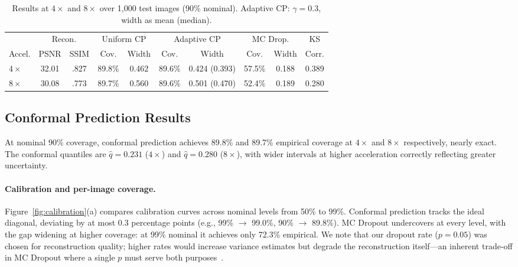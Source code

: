 \documentclass[runningheads]{llncs}
\begin{document}
\begin{table}[t]
    \centering
    \caption{Results at $4{\times}$ and $8{\times}$ over 1{,}000 test images (90\% nominal). Adaptive CP: $\gamma{=}0.3$, width as mean (median).}
    \label{tab:results}
    \begin{tabular}{lccccccccc}
        \toprule
                  & \multicolumn{2}{c}{Recon.} & \multicolumn{2}{c}{Uniform CP} & \multicolumn{2}{c}{Adaptive CP} & \multicolumn{2}{c}{MC Drop.} & KS                                              \\
        \cmidrule(lr){2-3} \cmidrule(lr){4-5} \cmidrule(lr){6-7} \cmidrule(lr){8-9} \cmidrule(lr){10-10}
        Accel.    & PSNR                       & SSIM                           & Cov.                            & Width                        & Cov.   & Width         & Cov.   & Width & Corr. \\
        \midrule
        $4\times$ & 32.01                      & .827                           & 89.8\%                          & 0.462                        & 89.6\% & 0.424 (0.393) & 57.5\% & 0.188 & 0.389 \\
        $8\times$ & 30.08                      & .773                           & 89.7\%                          & 0.560                        & 89.6\% & 0.501 (0.470) & 52.4\% & 0.189 & 0.280 \\
        \bottomrule
    \end{tabular}
\end{table}

\subsection{Conformal Prediction Results}

At nominal 90\% coverage, conformal prediction achieves 89.8\% and 89.7\% empirical coverage at $4{\times}$ and $8{\times}$ respectively, nearly exact. The conformal quantiles are $\hat{q}{=}0.231$ ($4{\times}$) and $\hat{q}{=}0.280$ ($8{\times}$), with wider intervals at higher acceleration correctly reflecting greater uncertainty.

\paragraph{Calibration and per-image coverage.} Figure~\ref{fig:calibration}(a) compares calibration curves across nominal levels from 50\% to 99\%. Conformal prediction tracks the ideal diagonal, deviating by at most 0.3 percentage points (e.g., 99\% $\to$ 99.0\%, 90\% $\to$ 89.8\%). MC Dropout undercovers at every level, with the gap widening at higher coverage: at 99\% nominal it achieves only 72.3\% empirical. We note that our dropout rate ($p{=}0.05$) was chosen for reconstruction quality; higher rates would increase variance estimates but degrade the reconstruction itself---an inherent trade-off in MC Dropout where a single $p$ must serve both purposes~\cite{gal2016dropout}.
\end{document}
